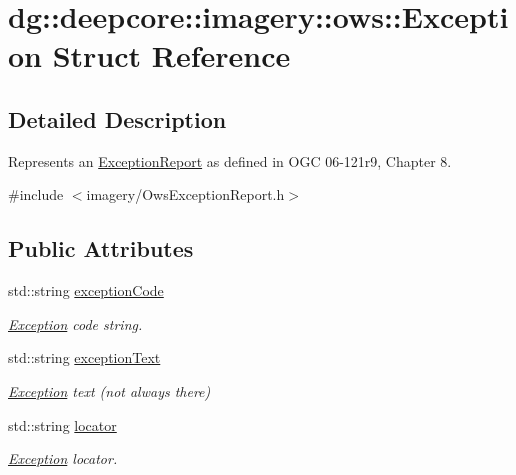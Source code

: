 \hypertarget{structdg_1_1deepcore_1_1imagery_1_1ows_1_1_exception}{}\section{dg\+:\+:deepcore\+:\+:imagery\+:\+:ows\+:\+:Exception Struct Reference}
\label{structdg_1_1deepcore_1_1imagery_1_1ows_1_1_exception}


\subsection{Detailed Description}
Represents an \hyperlink{structdg_1_1deepcore_1_1imagery_1_1ows_1_1_exception_report}{Exception\+Report} as defined in O\+GC 06-\/121r9, Chapter 8. 

{\ttfamily \#include $<$imagery/\+Ows\+Exception\+Report.\+h$>$}

\subsection*{Public Attributes}
\begin{DoxyCompactItemize}
\item 
std\+::string \hyperlink{structdg_1_1deepcore_1_1imagery_1_1ows_1_1_exception_a303c8746c8f2984f33932fbbe2dd6060}{exception\+Code}
\begin{DoxyCompactList}\small\item\em \hyperlink{structdg_1_1deepcore_1_1imagery_1_1ows_1_1_exception}{Exception} code string. \end{DoxyCompactList}\item 
std\+::string \hyperlink{structdg_1_1deepcore_1_1imagery_1_1ows_1_1_exception_ab5a2f87d565041746d293c3969a08149}{exception\+Text}
\begin{DoxyCompactList}\small\item\em \hyperlink{structdg_1_1deepcore_1_1imagery_1_1ows_1_1_exception}{Exception} text (not always there) \end{DoxyCompactList}\item 
std\+::string \hyperlink{structdg_1_1deepcore_1_1imagery_1_1ows_1_1_exception_a4dc321f3290f076b295511ceaba8738e}{locator}
\begin{DoxyCompactList}\small\item\em \hyperlink{structdg_1_1deepcore_1_1imagery_1_1ows_1_1_exception}{Exception} locator. \end{DoxyCompactList}\end{DoxyCompactItemize}


